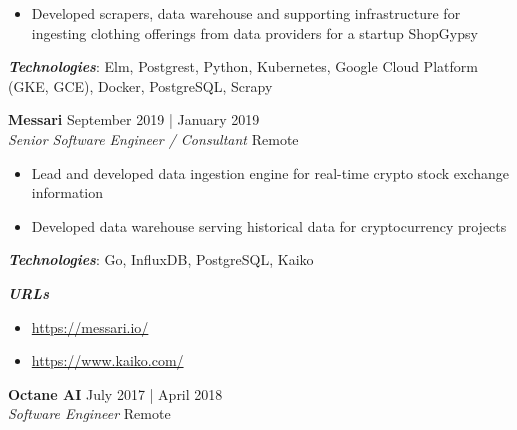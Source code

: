 \documentclass[a4paper]{article}
\newenvironment{jobdetails}%
    {\list{}{\leftmargin=4mm}\item[]}%
    {\endlist}
\begin{document}
\begin{jobdetails}
\begin{itemize}
    \item Developed scrapers, data warehouse and supporting infrastructure for ingesting clothing offerings from data providers for a startup ShopGypsy
\end{itemize}
\vspace{2mm}

\textbf{\textit{Technologies}}: Elm, Postgrest, Python, Kubernetes, Google Cloud Platform (GKE, GCE), Docker, PostgreSQL, Scrapy

\end{jobdetails}
\vspace{1mm}


\textbf{Messari} \hfill September 2019 | January 2019 \\
\textit{Senior Software Engineer / Consultant } \hfill Remote \\
\vspace{2mm}

\begin{jobdetails}
\begin{itemize}
    \item Lead and developed data ingestion engine for real-time crypto stock exchange information
    \item Developed data warehouse serving historical data for cryptocurrency projects
\end{itemize}
\vspace{2mm}

\textbf{\textit{Technologies}}: Go, InfluxDB, PostgreSQL, Kaiko

\textbf{\textit{URLs}}
\begin{itemize} \itemsep 1pt
	\item \url{https://messari.io/}
    \item \url{https://www.kaiko.com/}
\end{itemize}

\end{jobdetails}
\vspace{1mm}


\textbf{Octane AI} \hfill July 2017 | April 2018 \\
\textit{Software Engineer} \hfill Remote \\
\vspace{2mm}
\end{document}
